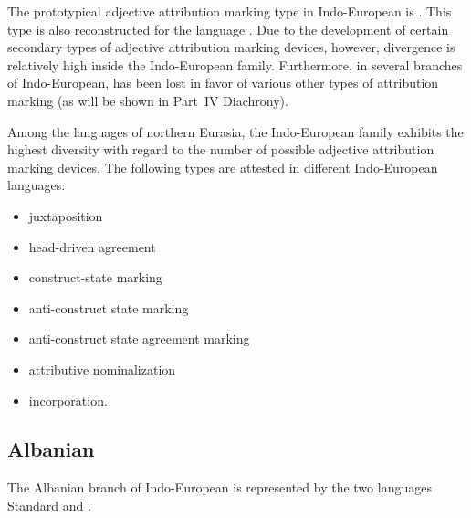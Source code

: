 The prototypical adjective attribution marking type in Indo-European is . This type is also reconstructed for the  language \citep{decsy1991,watkins1998}. Due to the development of certain secondary types of adjective attribution marking devices, however, divergence is relatively high inside the Indo-European family. Furthermore, in several branches of Indo-European,  has been lost in favor of various other types of attribution marking (as will be shown in Part~IV Diachrony).

Among the languages of northern Eurasia, the Indo-European family exhibits the highest diversity with regard to the number of possible adjective attribution marking devices. The following types are attested in different Indo-European languages:
\begin{itemize}
\item juxtaposition
\item head\hyp{}driven agreement
\item construct-state marking
\item anti\hyp{}construct state marking
\item anti\hyp{}construct state agreement marking
\item attributive nominalization
\item incorporation.
\end{itemize}

\subsection{Albanian}
\label{albanian synchr}
The Albanian branch of Indo-European is represented by the two languages Standard  and .

